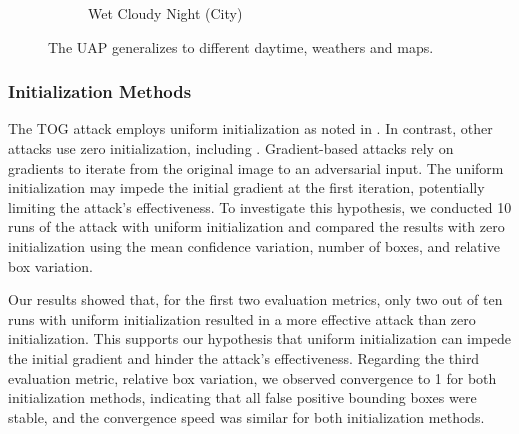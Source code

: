 \begin{figure}[tbp]
\begin{subfigure}[b]{0.22\textwidth}
        \caption{Wet Cloudy Night (City)}
        \label{fig:wet_cloudy}
    \end{subfigure}
  \caption{The UAP generalizes to different daytime, weathers and maps.}
  \label{fig:carla}
\end{figure}

\subsubsection{Initialization Methods}

The TOG attack employs uniform initialization as noted in \cite{chow2020adversarial}. In contrast, other attacks use zero initialization, including \cite{fischer2017adversarial,li2021universal,madry2017towards}. Gradient-based attacks rely on gradients to iterate from the original image to an adversarial input. The uniform initialization may impede the initial gradient at the first iteration, potentially limiting the attack's effectiveness. To investigate this hypothesis, we conducted 10 runs of the attack with uniform initialization and compared the results with zero initialization using the mean confidence variation, number of boxes, and relative box variation.

Our results showed that, for the first two evaluation metrics, only two out of ten runs with uniform initialization resulted in a more effective attack than zero initialization. This supports our hypothesis that uniform initialization can impede the initial gradient and hinder the attack's effectiveness. Regarding the third evaluation metric, relative box variation, we observed convergence to 1 for both initialization methods, indicating that all false positive bounding boxes were stable, and the convergence speed was similar for both initialization methods.



